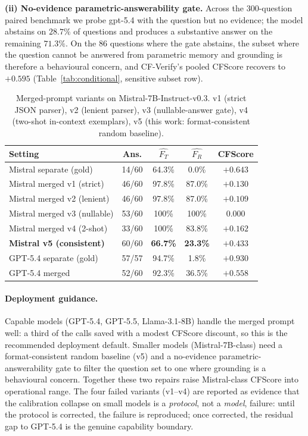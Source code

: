\documentclass[11pt]{article}
\begin{document}
\textbf{(ii) No-evidence parametric-answerability gate.} Across the 300-question paired benchmark we probe gpt-5.4 with the question but no evidence; the model abstains on $28.7\%$ of questions and produces a substantive answer on the remaining $71.3\%$. On the $86$ questions where the gate abstains, the subset where the question cannot be answered from parametric memory and grounding is therefore a behavioural concern, and CF-Verify's pooled CFScore recovers to $+0.595$ (Table~\ref{tab:conditional}, sensitive subset row).

\begin{table}[t]
\centering
\scriptsize
\caption{Merged-prompt variants on Mistral-7B-Instruct-v0.3. v1 (strict JSON parser), v2 (lenient parser), v3 (nullable-answer gate), v4 (two-shot in-context exemplars), v5 (this work: format-consistent random baseline).}
\label{tab:merged}
\begin{tabular}{@{}lcccc@{}}
\toprule
Setting & Ans. & $\widehat{F_T}$ & $\widehat{F_R}$ & CFScore \\
\midrule
Mistral separate (gold)   & 14/60 & 64.3\% & 0.0\%  & $+0.643$ \\
Mistral merged v1 (strict) & 46/60 & 97.8\% & 87.0\% & $+0.130$ \\
Mistral merged v2 (lenient)& 46/60 & 97.8\% & 87.0\% & $+0.109$ \\
Mistral merged v3 (nullable)& 53/60 & 100\% & 100\% & $0.000$ \\
Mistral merged v4 (2-shot) & 33/60 & 100\% & 83.8\% & $+0.162$ \\
\textbf{Mistral v5 (consistent)} & 60/60 & \textbf{66.7\%} & \textbf{23.3\%} & $\mathbf{+0.433}$ \\
\midrule
GPT-5.4 separate (gold)   & 57/57 & 94.7\% & 1.8\% & $+0.930$ \\
GPT-5.4 merged              & 52/60 & 92.3\% & 36.5\% & $+0.558$ \\
\bottomrule
\end{tabular}
\end{table}

\paragraph{Deployment guidance.} Capable models (GPT-5.4, GPT-5.5, Llama-3.1-8B) handle the merged prompt well: a third of the calls saved with a modest CFScore discount, so this is the recommended deployment default. Smaller models (Mistral-7B-class) need a format-consistent random baseline (v5) and a no-evidence parametric-answerability gate to filter the question set to one where grounding is a behavioural concern. Together these two repairs raise Mistral-class CFScore into operational range. The four failed variants (v1--v4) are reported as evidence that the calibration collapse on small models is a \emph{protocol}, not a \emph{model}, failure: until the protocol is corrected, the failure is reproduced; once corrected, the residual gap to GPT-5.4 is the genuine capability boundary.
\end{document}
